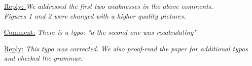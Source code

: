 \documentclass[12pt]{article}
\begin{document}
      \underline{Reply: } {\it
      We addressed the first two weaknesses in the above comments.\\ 
       Figures 1 and 2 were changed with a higher quality pictures.      }

\item \underline{Comment:} {\it There is a typo: "a the second one was recalculating" }

      \underline{Reply:} {\it This typo was corrected. We also proof-read the paper for additional typos and checked the grammar. }
      
\end{document}
